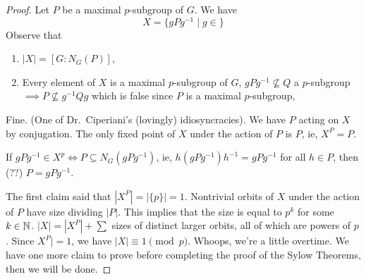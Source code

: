 \begin{proof}
    Let $P$ be a maximal $p$-subgroup of $G$. We have \[
    X= \{gPg^{-1} \mid g\in \} 
    \] Observe that 
    \begin{enumerate}
        \item $|X|=[G:N_G(P)]$,
        \item Every element of $X$ is a maximal $p$-subgroup of $G$, $gPg^{-1} \not \subseteq Q$ a $p$-subgroup $\implies P \not\subseteq g^{-1}Qg$ which is false since $P$ is a maximal $p$-subgroup,
    \end{enumerate} Fine. (One of Dr.\ Ciperiani's (lovingly) idiosyncracies).
    We have $P$ acting on $X$ by conjugation. The only fixed point of $X$ under the action of $P$ is $P$, ie, $X^{P}=P$. 
\begin{claim}
    If $gPg^{-1}\in X^{p}\iff P \subseteq N_G(gPg^{-1})$, ie, $h(gPg^{-1})h^{-1}=gPg^{-1}$ for all $h\in P$, then (??) $P=gPg^{-1}$.
\end{claim}
The first claim said that $|X^{P}|=|\{p\}|=1$. Nontrivial orbits of $X$ under the action of $P$ have size dividing $|P|$. This implies that the size is equal to $p^{k}$ for some $k \in \mathbb{N}$. $|X|=|X^{P}|+\sum$ sizes of distinct larger orbits, all of which are powers of $p$. Since $X^{P}|=1$, we have $|X| \equiv 1 \pmod p$. Whoops, we're a little overtime. We have one more claim to prove before completing the proof of the Sylow Theorems, then we will be done.
\end{proof}



